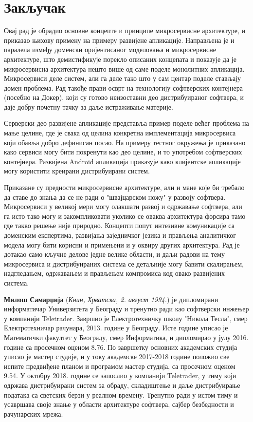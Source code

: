 \documentclass[12pt,oneside]{memoir}
\begin{document}
\chapter{Закључак}
Овај рад је обрадио основне концепте и принципе микросервисне архитектуре, и приказао њихову примену на примеру развијене апликације. Направљена је и паралела између доменски оријентисаног моделовања и микросервисне архитектуре, што демистификује порекло описаних концепата и показује да је микросервисна архитектура нешто више од саме поделе монолитних апликација. Микросервиси деле систем, али га деле тако што у сам центар поделе стављају домен проблема. Рад такође прави осврт на технологију софтверских контејнера (посебно на Докер), који су готово неизоставни део дистрибуираног софтвера, и даје добру почетну тачку за даље истраживање материје.

Серверски део развијене апликације представља пример поделе већег проблема на мање целине, где је свака од целина конкретна имплементација микросервиса који обавља добро дефинисан посао. На примеру тестног окружења је приказано како сервиси могу бити покренути као део целине, и то употребом софтверских контејнера. Развијена Android апликација приказује како клијентске апликације могу користити креирани дистрибуирани систем.

Приказане су предности микросервисне архитектуре, али и мане које би требало да ставе до знања да се не ради о "швајцарском ножу" у развоју софтвера. Микросервиси у великој мери могу олакшати развој и одржавање софтвера, али га исто тако могу и закомпликовати уколико се оваква архитектура форсира тамо где такво решење није природно. Концепти попут интезивне комуникације са доменским експертима, развијања заједничког језика и прављења аналитичког модела могу бити корисни и примењени и у оквиру других архитектура. Рад је дотакао само кључне делове једне велике области, и даљи радови на тему микросервиса и дистрибуираних система се детаљније могу бавити скалирањем, надгледањем, одржавањем и прављењем компромиса код овако развијених система.

\literatura

\backmatter

\begin{biografija}
\textbf{Милош Самарџија} (\emph{Книн, Хрватска, 2. август 1994.}) је дипломирани информатичар Универзитета у Београду и тренутно ради као софтверски инжењер у компанији Teletrader. Завршио је Електротехничку школу "Никола Тесла", смер Електротехничар рачунара, 2013. године у Београду. Исте године уписао је Математички факултет у Београду, смер Информатика, и дипломирао у јулу 2016. године са просечном оценом 8.76. По завршетку основних академских студија уписао је мастер студије, и у току академске 2017-2018 године положио све испите предвиђене планом и програмом мастер студија, са просечном оценом 9.54. У октобру 2018. године се запослио у компанији Teletrader, у тиму који одржава дистрибуирани систем за обраду, складиштење и даље дистрибуирање података са светских берзи у реалном времену. Тренутно ради у истом тиму и усавршава своје знање у области архитектуре софтвера, сајбер безбедности и рачунарских мрежа.
\end{biografija}
\end{document}
